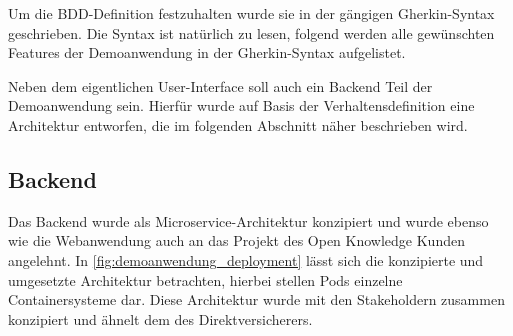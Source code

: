 Um die BDD-Definition festzuhalten wurde sie in der gängigen Gherkin-Syntax \cite{Gherkin} geschrieben. Die Syntax ist natürlich zu lesen, folgend werden alle gewünschten Features der Demoanwendung in der Gherkin-Syntax aufgelistet.











Neben dem eigentlichen User-Interface soll auch ein Backend Teil der Demoanwendung sein. Hierfür wurde auf Basis der Verhaltensdefinition eine Architektur entworfen, die im folgenden Abschnitt näher beschrieben wird.

\subsection{Backend}
\label{subsec:demoanwendung-backend}

Das Backend wurde als Microservice-Architektur \cite{MicroserviceArchitecture} konzipiert und wurde ebenso wie die Webanwendung auch an das Projekt des Open Knowledge Kunden angelehnt. In \autoref{fig:demoanwendung_deployment} lässt sich die konzipierte und umgesetzte Architektur betrachten, hierbei stellen Pods einzelne Containersysteme dar. Diese Architektur wurde mit den Stakeholdern zusammen konzipiert und ähnelt dem des Direktversicherers.

